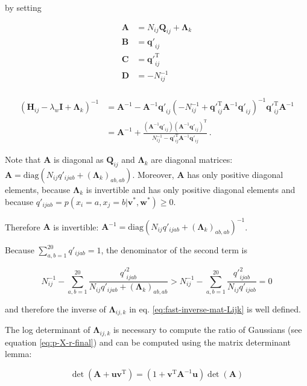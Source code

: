 \documentclass[12pt,a4paper,twoside]{book}
\newcommand{\eq}{\!=\!}
\renewcommand{\H}{\mathbf{H}}
\newcommand{\I}{\mathbf{I}}
\newcommand{\Lijk}{\mathbf{\Lambda}_{ij,k}}
\newcommand{\Lk}{\mathbf{\Lambda}_k}
\newcommand{\Qij}{\mathbf{Q}_{ij}}
\newcommand{\qij}{\mathbf{q\prime}_{ij}}
\renewcommand{\v}{\mathbf{v}}
\newcommand{\w}{\mathbf{w}}
\theoremstyle{definition}
\theoremstyle{definition}
\theoremstyle{remark}
\begin{document}
by setting

\begin{align}
  \mathbf{A} &= N_{ij} \Qij + \Lk \\
  \mathbf{B} &= \qij \\
  \mathbf{C} &= \qij^\mathrm{T} \\
  \mathbf{D} &=- N_{ij}^{-1} \\
\end{align}

\begin{align}
      \left( \H_{ij} - \lambda_w \I + \Lk \right)^{-1} & = \mathbf{A}^{-1} - \mathbf{A}^{-1} \qij  \left( -N_{ij}^{-1}  + \qij^\mathrm{T} \mathbf{A}^{-1} \qij \right)^{-1}  \qij^\mathrm{T} \mathbf{A}^{-1} \\
     & = \mathbf{A}^{-1} + \frac{ (\mathbf{A}^{-1} \qij) (\mathbf{A}^{-1} \qij)^{\mathrm{T}} }{ N_{ij}^{-1} - \qij^\mathrm{T} \mathbf{A}^{-1} \qij} \,.
\label{eq:fast-inverse-mat-Lijk}
\end{align}

Note that \(\mathbf{A}\) is diagonal as \(\Qij\) and \(\Lk\) are
diagonal matrices:
\(\mathbf{A} = \text{diag}(N_{ij} q'_{ijab} + (\Lk)_{ab,ab})\).
Moreover, \(\mathbf{A}\) has only positive diagonal elements, because
\(\Lk\) is invertible and has only positive diagonal elements and
because \(q'_{ijab} = p(x_i \eq a, x_j \eq b | \v^*,\w^*) \ge 0\).

Therefore \(\mathbf{A}\) is invertible:
\(\mathbf{A}^{-1} = \text{diag}(N_{ij} q'_{ijab} + (\Lk)_{ab,ab} )^{-1}\).

Because \(\sum_{a,b=1}^{20} q'_{ijab} = 1\), the denominator of the
second term is

\begin{equation}
    N_{ij}^{-1} - \sum_{a,b=1}^{20}  \frac{{q'}_{ijab}^2}{N_{ij} q'_{ijab} + {(\Lk)}_{ab,ab} } > N_{ij}^{-1} - \sum_{a,b=1}^{20} \frac{{q'}^2_{ijab}}{N_{ij} q'_{ijab}} = 0
\end{equation}

and therefore the inverse of \(\Lijk\) in eq.
\eqref{eq:fast-inverse-mat-Lijk} is well defined.

The log determinant of \(\Lijk\) is necessary to compute the ratio of
Gaussians (see equation \eqref{eq:p-X-r-final}) and can be computed using
the matrix determinant lemma:

\begin{equation}
  \det(\mathbf{A} + \mathbf{uv}^\mathrm{T}) = (1+\mathbf{v}^\mathrm{T} \mathbf{A}^{-1} \mathbf{u}) \det(\mathbf{A})
\end{equation}
\end{document}
